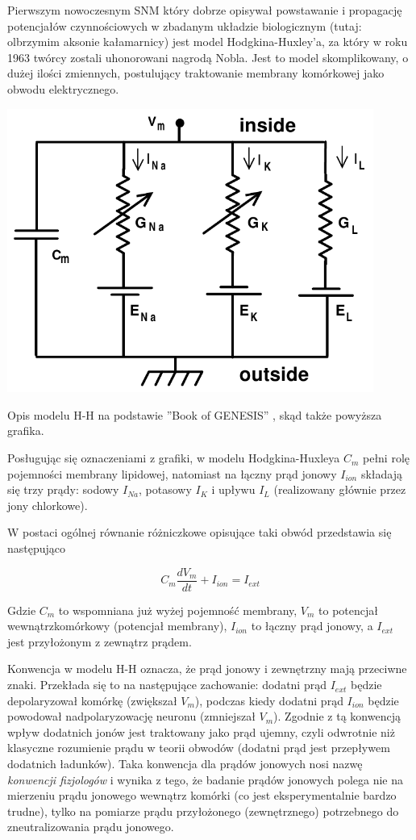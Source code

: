   Pierwszym nowoczesnym SNM który dobrze opisywał powstawanie i propagację potencjałów czynnościowych w zbadanym układzie biologicznym (tutaj: olbrzymim aksonie kałamarnicy) jest model Hodgkina-Huxley'a, za który w roku 1963 twórcy zostali uhonorowani nagrodą Nobla. Jest to model skomplikowany, o dużej ilości zmiennych, postulujący traktowanie membrany komórkowej jako obwodu elektrycznego.

  \includegraphics[width=120mm]{images/hh.png}

  Opis modelu H-H na podstawie ''Book of GENESIS'' \cite{genesis}, skąd także powyższa grafika.

  Posługując się oznaczeniami z grafiki, w modelu Hodgkina-Huxleya $C_{m}$ pełni rolę pojemności membrany lipidowej, natomiast na łączny prąd jonowy $I_{ion}$ składają się trzy prądy: sodowy $I_{Na}$, potasowy $I_{K}$ i upływu $I_{L}$ (realizowany głównie przez jony chlorkowe).

  W postaci ogólnej równanie różniczkowe opisujące taki obwód przedstawia się następująco

  \begin{equation} \label{hh:1}
    C_{m} \frac{dV_{m}}{dt} + I_{ion} = I_{ext}
  \end{equation}

  Gdzie $C_{m}$ to wspomniana już wyżej pojemność membrany, $V_{m}$ to potencjał wewnątrzkomórkowy (potencjał membrany), $I_{ion}$ to łączny prąd jonowy, a $I_{ext}$ jest przyłożonym z zewnątrz prądem.

  Konwencja w modelu H-H oznacza, że prąd jonowy i zewnętrzny mają przeciwne znaki. Przekłada się to na następujące zachowanie: dodatni prąd $I_{ext}$ będzie depolaryzował komórkę (zwiększał $V_{m}$), podczas kiedy dodatni prąd $I_{ion}$ będzie powodował nadpolaryzowację neuronu (zmniejszał $V_{m}$). Zgodnie z tą konwencją wpływ dodatnich jonów jest traktowany jako prąd ujemny, czyli odwrotnie niż klasyczne rozumienie prądu w teorii obwodów (dodatni prąd jest przepływem dodatnich ładunków). Taka konwencja dla prądów jonowych nosi nazwę \emph{konwencji fizjologów} i wynika z tego, że badanie prądów jonowych polega nie na mierzeniu prądu jonowego wewnątrz komórki (co jest eksperymentalnie bardzo trudne), tylko na pomiarze prądu przyłożonego (zewnętrznego) potrzebnego do zneutralizowania prądu jonowego.


